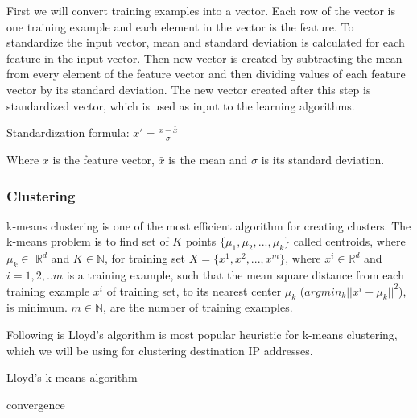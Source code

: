 \documentclass[10pt,oneside,a4paper]{article}
\begin{document}
First we will convert training examples into a vector. Each row of the vector is one training example and each element in the vector is the feature. To standardize the input vector, mean and standard deviation is calculated for each feature in the input vector. Then new vector is created by subtracting the mean from every element of the feature vector and then dividing values of each feature vector by its standard deviation. The new vector created after this step is standardized vector, which is used as input to the learning algorithms.

\hspace{2cm} Standardization formula: $x' = \frac{x - \bar{x}}{\sigma}$

Where $x$ is the feature vector, ${\bar{x}}$ is the mean and $\sigma$  is its standard deviation.

\subsubsection{Clustering}

k-means clustering is one of the most efficient algorithm for creating clusters. The k-means problem is to find set of $K$ points $\{\mu_{1}, \mu_{2}, ..., \mu_{k}\}$ called centroids, where $\mu_{k}\in$ $\mathbb{R}^d$ and $K \in \mathbb{N}$, for training set $X = \{x^{1}, x^{2}, ..., x^{m}\}$, where $x^{i} \in \mathbb{R}^d$
and $i= {1,2, ..m}$ is a training example, such that the mean square distance from each training example $x^{i}$ of training set, to its nearest center $\mu_{k}$ ($argmin_{k} || x^{i} {-} \mu_{k} ||^{2}$), is minimum. $m \in \mathbb{N}$, are the number of training examples.\cite{kmeanClustering}

Following is Lloyd's algorithm is most popular heuristic for k-means clustering, which we will be using for clustering destination IP addresses.

\begin{algorithm}
\caption{Lloyd's k-means algorithm}\label{kmeans}
\begin{algorithmic}
\Repeat
  \EndFor
  \EndFor
\Until convergence
\end{algorithmic}
\end{algorithm}
\end{document}
